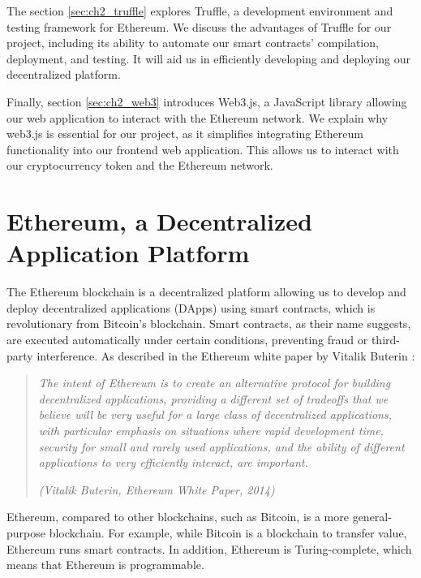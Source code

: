 The section \ref{sec:ch2_truffle} explores Truffle, a development environment and testing framework for Ethereum. We discuss the advantages of Truffle
for our project, including its ability to automate our smart contracts' compilation, deployment, and testing. It will aid us in efficiently developing
and deploying our decentralized platform.

Finally, section \ref{sec:ch2_web3} introduces Web3.js, a JavaScript library allowing our web application to interact with the Ethereum network.
We explain why web3.js is essential for our project, as it simplifies integrating Ethereum functionality into our frontend web application.
This allows us to interact with our cryptocurrency token and the Ethereum network.


\section{Ethereum, a Decentralized Application Platform}
\label{sec:ch2_ethereum}

The Ethereum blockchain is a decentralized platform allowing us to develop and deploy decentralized applications (DApps) using smart contracts, which is 
revolutionary from Bitcoin's blockchain. Smart contracts, as their name suggests, are executed automatically under certain conditions,
preventing fraud or third-party interference. As described in the Ethereum white paper by Vitalik Buterin \cite{ethereum_white_paper}:

\begin{quote}
    \textit{The intent of Ethereum is to create an alternative protocol for building decentralized applications, providing a different set of tradeoffs that we
        believe will be very useful for a large class of decentralized applications, with particular emphasis on situations where rapid development time,
        security for small and rarely used applications, and the ability of different applications to very efficiently interact, are important.}
    
    \textit{(Vitalik Buterin, Ethereum White Paper, 2014)}
\end{quote}


Ethereum, compared to other blockchains, such as Bitcoin, is a more general-purpose blockchain. For example, while Bitcoin is a blockchain to transfer
value, Ethereum runs smart contracts. In addition, Ethereum is Turing-complete, which means that Ethereum is programmable.


